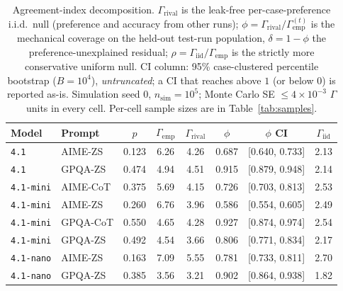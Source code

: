 \documentclass{article}
\newcommand{\agreementIndex}{\Gamma}
\begin{document}
\begin{table}[H]
\centering
\caption{Agreement-index decomposition. $\agreementIndex_{\mathrm{rival}}$ is the
leak-free per-case-preference i.i.d.\ null (preference and accuracy from
other runs); $\phi=\agreementIndex_{\mathrm{rival}}/\agreementIndex_{\mathrm{emp}}^{(t)}$ is
the mechanical coverage on the held-out test-run population,
$\delta=1-\phi$ the preference-unexplained residual; $\rho=\agreementIndex_{\mathrm{iid}}/\agreementIndex_{\mathrm{emp}}$
is the strictly more conservative uniform null. CI column: 95\%
case-clustered percentile bootstrap ($B=10^4$), \emph{untruncated}; a CI
that reaches above $1$ (or below $0$) is reported as-is. Simulation
seed 0, $n_{\mathrm{sim}}=10^5$; Monte Carlo SE $\le4\times10^{-3}$
$\agreementIndex$ units in every cell. Per-cell sample sizes are in
Table~\ref{tab:samples}.}
\label{tab:kappa}
\begin{tabular}{llcccccc}
\toprule
Model & Prompt & $p$ & $\agreementIndex_{\mathrm{emp}}$ & $\agreementIndex_{\mathrm{rival}}$ & $\phi$ & $\phi$ CI & $\agreementIndex_{\mathrm{iid}}$ \\
\midrule
\texttt{4.1} & AIME-ZS & 0.123 & 6.26 & 4.26 & 0.687 & [0.640, 0.733] & 2.13 \\
\texttt{4.1} & GPQA-ZS & 0.474 & 4.94 & 4.51 & 0.915 & [0.879, 0.948] & 2.14 \\
\texttt{4.1-mini} & AIME-CoT & 0.375 & 5.69 & 4.15 & 0.726 & [0.703, 0.813] & 2.53 \\
\texttt{4.1-mini} & AIME-ZS & 0.260 & 6.76 & 3.96 & 0.586 & [0.554, 0.605] & 2.49 \\
\texttt{4.1-mini} & GPQA-CoT & 0.550 & 4.65 & 4.28 & 0.927 & [0.874, 0.974] & 2.54 \\
\texttt{4.1-mini} & GPQA-ZS & 0.492 & 4.54 & 3.66 & 0.806 & [0.771, 0.834] & 2.17 \\
\texttt{4.1-nano} & AIME-ZS & 0.163 & 7.09 & 5.55 & 0.781 & [0.733, 0.811] & 2.70 \\
\texttt{4.1-nano} & GPQA-ZS & 0.385 & 3.56 & 3.21 & 0.902 & [0.864, 0.938] & 1.82 \\
\bottomrule
\end{tabular}
\end{table}
\end{document}
